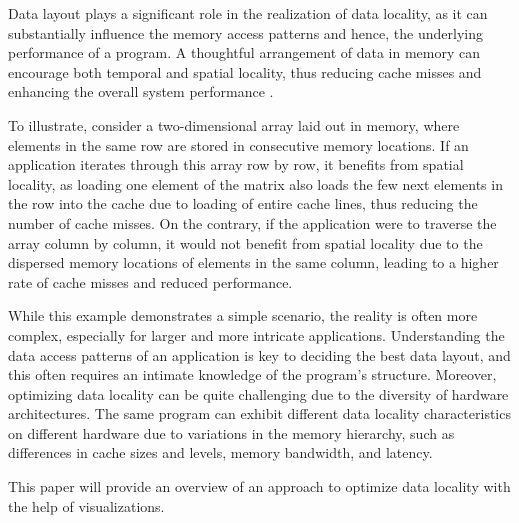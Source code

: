 Data layout plays a significant role in the realization of data locality, as it can substantially influence the memory access patterns and hence, the underlying performance of a program. A thoughtful arrangement of data in memory can encourage both temporal and spatial locality, thus reducing cache misses and enhancing the overall system performance \cite{esseghir1993improving}.

To illustrate, consider a two-dimensional array laid out in memory, where elements in the same row are stored in consecutive memory locations. If an application iterates through this array row by row, it benefits from spatial locality, as loading one element of the matrix also loads the few next elements in the row into the cache due to loading of entire cache lines, thus reducing the number of cache misses. On the contrary, if the application were to traverse the array column by column, it would not benefit from spatial locality due to the dispersed memory locations of elements in the same column, leading to a higher rate of cache misses and reduced performance.

While this example demonstrates a simple scenario, the reality is often more complex, especially for larger and more intricate applications. Understanding the data access patterns of an application is key to deciding the best data layout, and this often requires an intimate knowledge of the program's structure. Moreover, optimizing data locality can be quite challenging due to the diversity of hardware architectures. The same program can exhibit different data locality characteristics on different hardware due to variations in the memory hierarchy, such as differences in cache sizes and levels, memory bandwidth, and latency.

This paper will provide an overview of an approach to optimize data locality with the help of visualizations.
